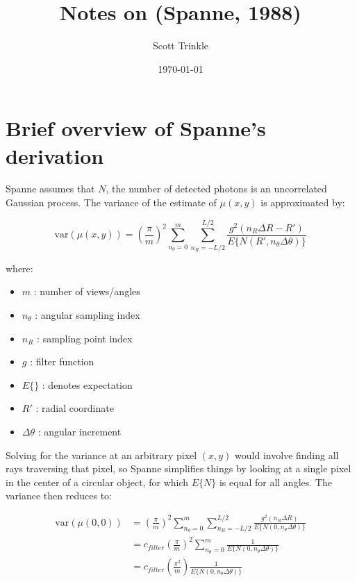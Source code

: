 \documentclass[11pt]{article}
\author{Scott Trinkle}
\date{\today}
\title{Notes on (Spanne, 1988)}
\begin{document}
\maketitle

\section{Brief overview of Spanne's derivation}
\label{sec:org400da3c}
Spanne assumes that \(N\), the number of detected photons is an uncorrelated 
Gaussian process. The variance of the estimate of \(\mu(x,y)\) is approximated by:

\begin{equation}
        \text{var}(\mu(x,y)) = \left(\frac{\pi}{m}\right)^2 \sum_{n_{\theta}=0}^m \sum_{n_R = -L/2}^{L/2} \frac{g^2(n_R\Delta R - R')}{E\{N(R',n_{\theta}\Delta\theta)\}}
\end{equation}

where: 
\begin{itemize}
\item \(m\) : number of views/angles
\item \(n_{\theta}\) : angular sampling index
\item \(n_R\) : sampling point index
\item \(g\) : filter function
\item \(E\{\}\) : denotes expectation
\item \(R'\) : radial coordinate
\item \(\Delta\theta\) : angular increment
\end{itemize}

Solving for the variance at an arbitrary pixel \((x,y)\) would involve finding all rays 
traversing that pixel, so Spanne simplifies things by looking at a single pixel in the 
center of a circular object, for which \(E\{N\}\) is equal for all angles. The variance then reduces to:


\begin{align}
  \text{var}(\mu(0,0)) &= \left(\frac{\pi}{m}\right)^2 \sum_{n_{\theta}=0}^m \sum_{n_R = -L/2}^{L/2} \frac{g^2(n_R\Delta R)}{E\{N(0,n_{\theta}\Delta\theta)\}} \nonumber \\
                       &= c_{filter} \left(\frac{\pi}{m}\right)^2 \sum_{n_{\theta}=0}^m \frac{1}{E\{N(0,n_{\theta}\Delta\theta)\}} \nonumber\\
                       &= c_{filter} \left(\frac{\pi^2}{m}\right) \frac{1}{E\{N(0,n_{\theta}\Delta\theta)\}} \label{eq:V}
\end{align}
\end{document}
